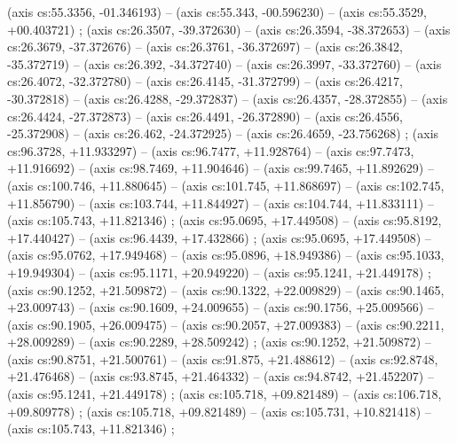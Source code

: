     (axis cs:55.3356,    -01.346193) --  (axis cs:55.343,    -00.596230) --  (axis cs:55.3529,    +00.403721) ;
    (axis cs:26.3507,    -39.372630) --  (axis cs:26.3594,    -38.372653) --  (axis cs:26.3679,    -37.372676) --  (axis cs:26.3761,    -36.372697) --  (axis cs:26.3842,    -35.372719) --  (axis cs:26.392,    -34.372740) --  (axis cs:26.3997,    -33.372760) --  (axis cs:26.4072,    -32.372780) --  (axis cs:26.4145,    -31.372799) --  (axis cs:26.4217,    -30.372818) --  (axis cs:26.4288,    -29.372837) --  (axis cs:26.4357,    -28.372855) --  (axis cs:26.4424,    -27.372873) --  (axis cs:26.4491,    -26.372890) --  (axis cs:26.4556,    -25.372908) --  (axis cs:26.462,    -24.372925) --  (axis cs:26.4659,    -23.756268) ;
    (axis cs:96.3728,    +11.933297) --  (axis cs:96.7477,    +11.928764) --  (axis cs:97.7473,    +11.916692) --  (axis cs:98.7469,    +11.904646) --  (axis cs:99.7465,    +11.892629) --  (axis cs:100.746,    +11.880645) --  (axis cs:101.745,    +11.868697) --  (axis cs:102.745,    +11.856790) --  (axis cs:103.744,    +11.844927) --  (axis cs:104.744,    +11.833111) --  (axis cs:105.743,    +11.821346) ;
    (axis cs:95.0695,    +17.449508) --  (axis cs:95.8192,    +17.440427) --  (axis cs:96.4439,    +17.432866) ;
    (axis cs:95.0695,    +17.449508) --  (axis cs:95.0762,    +17.949468) --  (axis cs:95.0896,    +18.949386) --  (axis cs:95.1033,    +19.949304) --  (axis cs:95.1171,    +20.949220) --  (axis cs:95.1241,    +21.449178) ;
    (axis cs:90.1252,    +21.509872) --  (axis cs:90.1322,    +22.009829) --  (axis cs:90.1465,    +23.009743) --  (axis cs:90.1609,    +24.009655) --  (axis cs:90.1756,    +25.009566) --  (axis cs:90.1905,    +26.009475) --  (axis cs:90.2057,    +27.009383) --  (axis cs:90.2211,    +28.009289) --  (axis cs:90.2289,    +28.509242) ;
    (axis cs:90.1252,    +21.509872) --  (axis cs:90.8751,    +21.500761) --  (axis cs:91.875,    +21.488612) --  (axis cs:92.8748,    +21.476468) --  (axis cs:93.8745,    +21.464332) --  (axis cs:94.8742,    +21.452207) --  (axis cs:95.1241,    +21.449178) ;
    (axis cs:105.718,    +09.821489) --  (axis cs:106.718,    +09.809778) ;
    (axis cs:105.718,    +09.821489) --  (axis cs:105.731,    +10.821418) --  (axis cs:105.743,    +11.821346) ;
